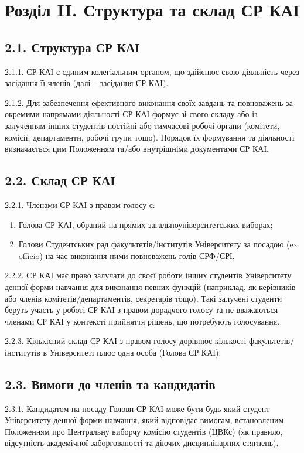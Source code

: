 \section*{Розділ II. Структура та склад СР КАІ}

\subsection*{2.1. Структура СР КАІ}
    2.1.1. СР КАІ є єдиним колегіальним органом, що здійснює свою діяльність через засідання її членів (далі – засідання СР КАІ).

    2.1.2. Для забезпечення ефективного виконання своїх завдань та повноважень за окремими напрямами діяльності СР КАІ формує зі свого складу або із залученням інших студентів постійні або тимчасові робочі органи (комітети, комісії, департаменти, робочі групи тощо). Порядок їх формування та діяльності визначається цим Положенням та/або внутрішніми документами СР КАІ.

\subsection*{2.2. Склад СР КАІ}
    2.2.1. Членами СР КАІ з правом голосу є:

        \begin{enumerate}[label=\alph*)]
            \item Голова СР КАІ, обраний на прямих загальноуніверситетських виборах;
            \item Голови Студентських рад факультетів/інститутів Університету за посадою (ex officio) на час виконання ними повноважень голів СРФ/СРІ.
        \end{enumerate}

    2.2.2. СР КАІ має право залучати до своєї роботи інших студентів Університету денної форми навчання для виконання певних функцій (наприклад, як керівників або членів комітетів/департаментів, секретарів тощо). Такі залучені студенти беруть участь у роботі СР КАІ з правом дорадчого голосу та не вважаються членами СР КАІ у контексті прийняття рішень, що потребують голосування.

    2.2.3. Кількісний склад СР КАІ з правом голосу дорівнює кількості факультетів/інститутів в Університеті плюс одна особа (Голова СР КАІ).

\subsection*{2.3. Вимоги до членів та кандидатів}
    2.3.1. Кандидатом на посаду Голови СР КАІ може бути будь-який студент Університету денної форми навчання, який відповідає вимогам, встановленим Положенням про Центральну виборчу комісію студентів (ЦВКс) (як правило, відсутність академічної заборгованості та діючих дисциплінарних стягнень).

